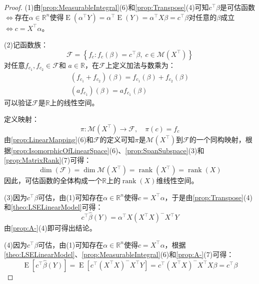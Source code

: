 \begin{proof}
	(1)由\cref{prop:MeasurableIntegral}(6)和\cref{prop:Transpose}(4)可知$c^{\top}\beta$是可估函数$\Leftrightarrow$存在$\alpha\in\mathbb{R}^{n}$使得$\operatorname{E}(\alpha^{\top}Y)=\alpha^{\top}\operatorname{E}(Y)=\alpha^{\top}X\beta=c^{\top}\beta$对任意的$\beta$成立$\Leftrightarrow c=X^{\top}\alpha$。\par
	(2)记函数族：
	\begin{equation*}
		\mathcal{F}=\left\{f_c:f_c(\beta)=c^{\top}\beta,\;c\in\mathcal{M}(X^{\top})\right\}
	\end{equation*}
	对任意$f_{c_1},f_{c_2}\in\mathcal{F}$和
	$a\in\mathbb{R}$，在$\mathcal{F}$上定义加法与数乘为：
	\begin{gather*}
		(f_{c_1}+f_{c_2})(\beta)=f_{c_1}(\beta)+f_{c_2}(\beta) \\
		(af_{c_1})(\beta)=af_{c_1}(\beta)
	\end{gather*}
	可以验证$\mathcal{F}$是$\mathbb{R}$上的线性空间。\par	
	定义映射：
	\begin{equation*}
		\pi:\mathcal{M}(X^{\top})\to\mathcal{F},\quad\pi(c)=f_c
	\end{equation*}
	由\cref{prop:LinearMapping}(6)和$\mathcal{F}$的定义可知$\pi$是$\mathcal{M}(X^{\top})$到$\mathcal{F}$的一个同构映射，根据\cref{prop:IsomorphicOfLinearSpace}(6)、\cref{prop:SpanSubspace}(3)和\cref{prop:MatrixRank}(7)可得：
	\begin{equation*}
		\dim(\mathcal{F})=\dim\mathcal{M}(X^{\top})=\operatorname{rank}(X^{\top})=\operatorname{rank}(X)
	\end{equation*}
	因此，可估函数的全体构成一个$\mathbb{R}$上的$\operatorname{rank}(X)$维线性空间。\par
	(3)因为$c^{\top}\beta$可估，由(1)可知存在$\alpha\in\mathbb{R}^{n}$使得$c=X^{\top}\alpha$，于是由\cref{prop:Transpose}(4)和\cref{theo:LSELinearModel}可得：
	\begin{equation*}
		c^{\top}\hat{\beta}(Y)=\alpha^{\top}X(X^{\top}X)^-X^{\top}Y
	\end{equation*}
	由\cref{prop:A-}(4)即可得出结论。\par
	(4)因为$c^{\top}\beta$可估，由(1)可知存在$\alpha\in\mathbb{R}^{n}$使得$c=X^{\top}\alpha$，根据\cref{theo:LSELinearModel}、\cref{prop:MeasurableIntegral}(6)和\cref{prop:A-}(7)可得：
	\begin{equation*}
		\operatorname{E}[c^{\top}\hat{\beta}(Y)]=\operatorname{E}[c^{\top}(X^{\top}X)^-X^{\top}Y]=c^{\top}(X^{\top}X)^-X^{\top}X\beta=c^{\top}\beta

\end{equation*}
\end{proof}
